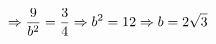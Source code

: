 \documentclass[preview]{standalone}
\begin{document}
\begin{align*}
\special{dvisvgm:raw <g id='unique000'>}\Rightarrow \frac{9}{b^2}=\frac{3}{4} \Rightarrow b^2=12 \Rightarrow b=2\sqrt{3}\special{dvisvgm:raw </g>}
\end{align*}
\end{document}
